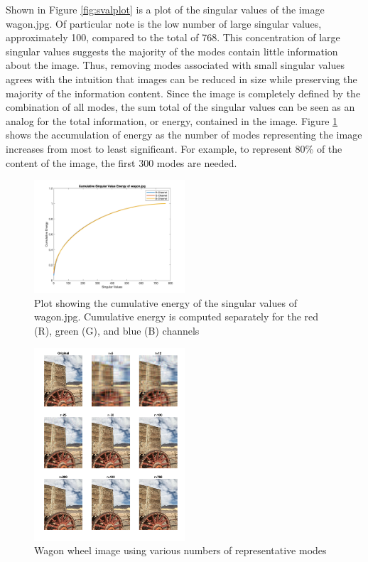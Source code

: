 \documentclass[conference]{IEEEtran}
\begin{document}
    Shown in Figure \ref{fig:svalplot} is a plot of the singular values of the image wagon.jpg. Of particular note is the low number of large singular values, approximately 100, compared to the total of 768. This concentration of large singular values suggests the majority of the modes contain little information about the image. Thus, removing modes associated with small singular values agrees with the intuition that images can be reduced in size while preserving the majority of the information content. Since the image is completely defined by the combination of all modes, the sum total of the singular values can be seen as an analog for the total information, or energy, contained in the image. Figure \ref{fig:svalenergyplot} shows the accumulation of energy as the number of modes representing the image increases from most to least significant. For example, to represent 80\% of the content of the image, the first 300 modes are needed.

    \begin{figure}[t]
    \includegraphics[width=0.5\textwidth]{sv_energy_wagon_rgb}
    \caption{Plot showing the cumulative energy of the singular values of wagon.jpg. Cumulative energy is computed separately for the red (R), green (G), and blue (B) channels}
    \label{fig:svalenergyplot}
    \end{figure}
    
    \begin{figure}[t]
    \includegraphics[width=0.5\textwidth]{show_different_r_wagon}
    \caption{Wagon wheel image using various numbers of representative modes}
    \label{fig:showwagondiffr}
    \end{figure}
\end{document}
